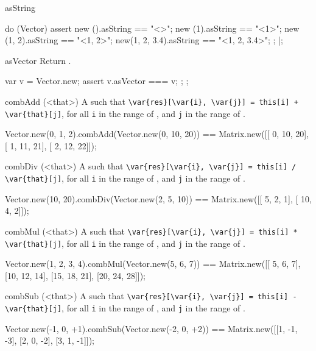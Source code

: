 \begin{urbiscriptapi}
\item[asString]%
\begin{urbiscript}
do (Vector)
{
  assert
  {
    new         ().asString == "<>";
    new        (1).asString == "<1>";
    new     (1, 2).asString == "<1, 2>";
    new(1, 2, 3.4).asString == "<1, 2, 3.4>";
  };
}|;
\end{urbiscript}

\item[asVector]%
  Return \this.
\begin{urbiscript}
{
  var v = Vector.new;
  assert { v.asVector === v; };
};
\end{urbiscript}

\item[combAdd](<that>)%
  A   such that
  \lstinline|\var{res}[\var{i}, \var{j}] = this[i] + \var{that}[j]|, for all
  \lstinline|i| in the range of \this, and \lstinline|j| in the range of
  \that.
\begin{urbiassert}
Vector.new(0, 1, 2).combAdd(Vector.new(0, 10, 20))
  == Matrix.new([[ 0, 10, 20],
                 [ 1, 11, 21],
                 [ 2, 12, 22]]);
\end{urbiassert}

\item[combDiv](<that>)%
  A   such that
  \lstinline|\var{res}[\var{i}, \var{j}] = this[i] / \var{that}[j]|, for all
  \lstinline|i| in the range of \this, and \lstinline|j| in the range of
  \that.
\begin{urbiassert}
Vector.new(10, 20).combDiv(Vector.new(2, 5, 10))
  == Matrix.new([[  5, 2, 1],
                 [ 10, 4, 2]]);
\end{urbiassert}

\item[combMul](<that>)%
  A   such that
  \lstinline|\var{res}[\var{i}, \var{j}] = this[i] * \var{that}[j]|, for all
  \lstinline|i| in the range of \this, and \lstinline|j| in the range of
  \that.
\begin{urbiassert}
Vector.new(1, 2, 3, 4).combMul(Vector.new(5, 6, 7))
  == Matrix.new([[ 5,  6,  7],
                 [10, 12, 14],
                 [15, 18, 21],
                 [20, 24, 28]]);
\end{urbiassert}

\item[combSub](<that>)%
  A   such that
  \lstinline|\var{res}[\var{i}, \var{j}] = this[i] - \var{that}[j]|, for all
  \lstinline|i| in the range of \this, and \lstinline|j| in the range of
  \that.
\begin{urbiassert}
Vector.new(-1, 0, +1).combSub(Vector.new(-2, 0, +2))
  == Matrix.new([[1, -1, -3],
                 [2,  0, -2],
                 [3,  1, -1]]);
\end{urbiassert}


\end{urbiscriptapi}
